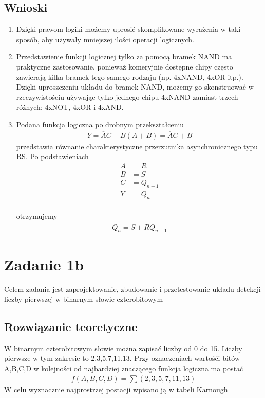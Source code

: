 \documentclass[12pt,a4paper,openright]{mwrep}
\begin{document}
\section{Wnioski}
\begin{enumerate}
    \item Dzięki prawom logiki możemy uprosić skomplikowane wyrażenia
    w taki sposób, aby używały mniejszej ilości operacji logicznych.
    \item Przedstawienie funkcji logicznej tylko za pomocą bramek NAND
    ma praktyczne zastosowanie, ponieważ komeryjnie dostępne chipy często
    zawierają kilka bramek tego samego rodzaju (np. 4xNAND, 4xOR itp.).
    Dzięki uproszczeniu układu do bramek NAND, możemy go skonstruować
    w rzeczywistościu używając tylko jednego chipu 4xNAND zamiast
    trzech różnych: 4xNOT, 4xOR i 4xAND.
    \item Podana funkcja logiczna po drobnym przekształceniu
    \begin{align*}
        Y = \overline{A}C + B(A + B) = \overline{A}C + B
    \end{align*}
    przedstawia równanie charakterystyczne przerzutnika 
    asynchronicznego typu RS. 
    Po podstawieniach
    \begin{align*}
        A &= R\\
        B &= S\\
        C &= Q_{n-1}\\
        Y &= Q_{n}\\
    \end{align*}
        
    otrzymujemy
    \begin{align*}
        Q_{n} = S + \overline{R}Q_{n-1}
    \end{align*}


\end{enumerate}
\chapter{Zadanie 1b}
Celem zadania jest zaprojektowanie, zbudowanie i przetestowanie 
układu detekcji liczby pierwszej w binarnym słowie czterobitowym
\section{Rozwiązanie teoretyczne}
W binarnym czterobitowym słowie można zapisać liczby od 0 do 15.
Liczby pierwsze w tym zakresie to 2,3,5,7,11,13.
Przy oznaczeniach wartośći bitów A,B,C,D w kolejności od najbardziej znaczącego funkcja logiczna ma postać
\begin{align*}
    f(A,B,C,D) = \sum(2,3,5,7,11,13)
\end{align*}
W celu wyznacznie najprostrzej postacji wpisano ją w tabeli Karnough
    
\end{document}
